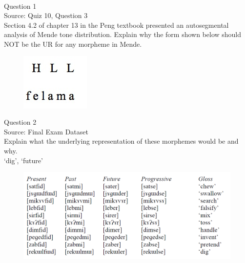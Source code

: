 \documentclass[12pt]{article}
\begin{document}
\newpage

\begin{center}
\textbf{{\color{red}{\HUGE END OF EXAM}}}\\

\end{center}
\newpage

\begin{center}
\textbf{{\color{blue}{\HUGE START OF EXAM\\}}}

\textbf{{\color{blue}{\HUGE Student ID: 2357\\}}}

\textbf{{\color{blue}{\HUGE 11:30 - 11:50 AM\\}}}

\end{center}
\newpage

{\large Question 1}\\

Source: Quiz 10, Question 3\\

Section 4.2 of chapter 13 in the Peng textbook presented an autosegmental analysis of Mende tone distribution. Explain why the form shown below should NOT be the UR for any morpheme in Mende.\\

\begin{figure}[H]
\includegraphics{../images/mende_junction_b.png}
\end{figure}

\newpage

{\large Question 2}\\

Source: Final Exam Dataset\\

Explain what the underlying representation of these morphemes would be and why.\\

`dig', `future'

\begin{figure}[H]
\includegraphics{../images/final_dataset.png}
\end{figure}
\end{document}
